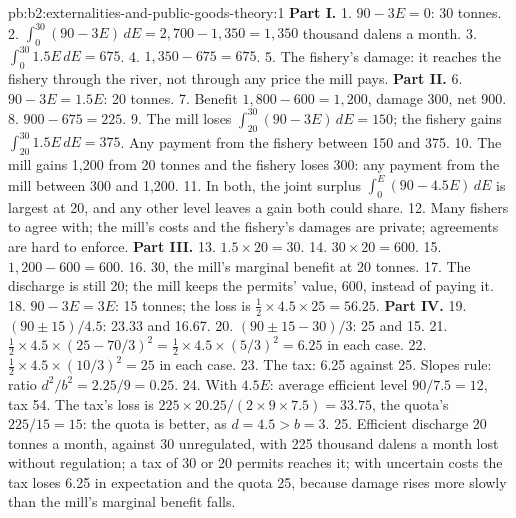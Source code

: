 \begin{solution}{pb:b2:externalities-and-public-goods-theory:1}
\textbf{Part I.}
1. $90 - 3E = 0$: 30 tonnes.
2. $\int_0^{30}(90 - 3E)\,dE = 2{,}700 - 1{,}350 = 1{,}350$ thousand dalens a month.
3. $\int_0^{30}1.5E\,dE = 675$.
4. $1{,}350 - 675 = 675$.
5. The fishery's damage: it reaches the fishery through the river, not through any price the mill pays.
\textbf{Part II.}
6. $90 - 3E = 1.5E$: 20 tonnes.
7. Benefit $1{,}800 - 600 = 1{,}200$, damage 300, net 900.
8. $900 - 675 = 225$.
9. The mill loses $\int_{20}^{30}(90 - 3E)\,dE = 150$; the fishery gains $\int_{20}^{30}1.5E\,dE = 375$. Any payment from the fishery between 150 and 375.
10. The mill gains 1{,}200 from 20 tonnes and the fishery loses 300: any payment from the mill between 300 and 1{,}200.
11. In both, the joint surplus $\int_0^E (90 - 4.5E)\,dE$ is largest at 20, and any other level leaves a gain both could share.
12. Many fishers to agree with; the mill's costs and the fishery's damages are private; agreements are hard to enforce.
\textbf{Part III.}
13. $1.5 \times 20 = 30$.
14. $30 \times 20 = 600$.
15. $1{,}200 - 600 = 600$.
16. 30, the mill's marginal benefit at 20 tonnes.
17. The discharge is still 20; the mill keeps the permits' value, 600, instead of paying it.
18. $90 - 3E = 3E$: 15 tonnes; the loss is $\tfrac12 \times 4.5 \times 25 = 56.25$.
\textbf{Part IV.}
19. $(90 \pm 15)/4.5$: 23.33 and 16.67.
20. $(90 \pm 15 - 30)/3$: 25 and 15.
21. $\tfrac12 \times 4.5 \times (25 - 70/3)^2 = \tfrac12 \times 4.5 \times (5/3)^2 = 6.25$ in each case.
22. $\tfrac12 \times 4.5 \times (10/3)^2 = 25$ in each case.
23. The tax: 6.25 against 25. Slopes rule: ratio $d^2/b^2 = 2.25/9 = 0.25$.
24. With $4.5E$: average efficient level $90/7.5 = 12$, tax 54. The tax's loss is $225 \times 20.25/(2 \times 9 \times 7.5) = 33.75$, the quota's $225/15 = 15$: the
quota is better, as $d = 4.5 > b = 3$.
25. Efficient discharge 20 tonnes a month, against 30 unregulated, with 225 thousand dalens a month lost without regulation;
a tax of 30 or 20 permits reaches it; with uncertain costs the tax loses 6.25 in expectation and the quota 25, because damage
rises more slowly than the mill's marginal benefit falls.
\end{solution}
